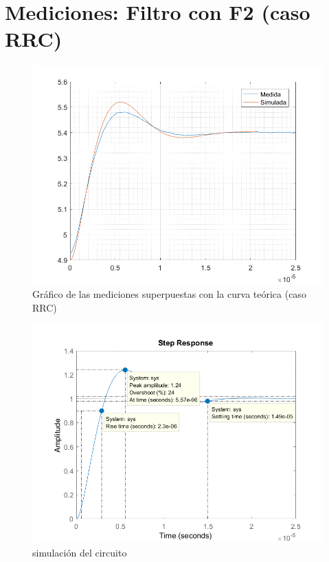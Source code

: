 \documentclass{article}
\begin{document}
\newpage

\section*{Mediciones: Filtro con F2 (caso RRC)}
\begin{figure}[H]
\centering
\includegraphics[width=0.8\linewidth]{images/conF2_superpuestas05.PNG}
\caption{Gráfico de las mediciones superpuestas con la curva teórica (caso RRC)}
\label{fig:superpF2}
\end{figure}

\begin{figure}[H]
\centering
\includegraphics[width=0.8\linewidth]{images/05vpp/simu.PNG}
\caption{simulación del circuito}
\label{fig:simu}
\end{figure}
\end{document}

